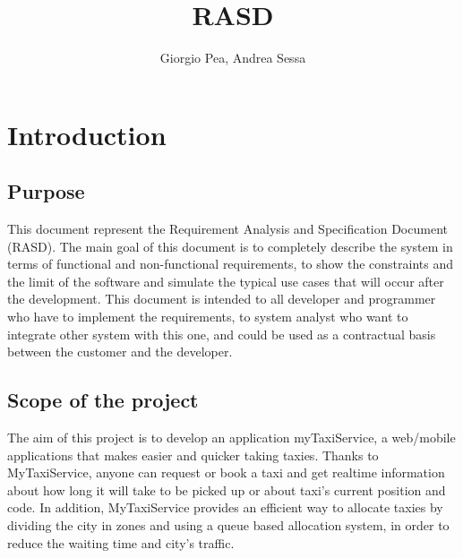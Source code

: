 \documentclass[11pt]{article} %
\title{RASD}
\author{Giorgio Pea, Andrea Sessa}
\begin{document}
\maketitle

\section{Introduction}
  \subsection{Purpose}
    This document represent the Requirement Analysis and Specification Document
    (RASD). The main goal of this document is to completely describe the system
    in terms of functional and non-functional requirements, to show the constraints and the limit
    of the software and simulate the typical use cases that will occur after the
    development. This document is intended to all developer and programmer who
    have to implement the requirements, to system analyst who want to integrate
    other system with this one, and could be used as a contractual basis between
    the customer and the developer.

  \subsection{Scope of the project}
    The aim of this project is to develop an application myTaxiService, a web/mobile applications that makes easier and quicker taking taxies.
    Thanks to MyTaxiService, anyone can request or book a taxi and get realtime information
    about how long it will take to be picked up or about taxi's current position and code.
    In addition, MyTaxiService provides an efficient way to allocate taxies by dividing the
    city in zones and using a queue based allocation system, in order to reduce the
    waiting time and city's traffic.
\end{document}
